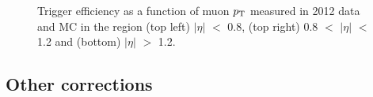 \begin{figure}[h!]

\begin{center}
\end{center}
\caption{Trigger efficiency as a function of muon $p_{\mathrm{T}}$ measured in
2012 data and MC in the region (top left) $|\eta|$ $<$ 0.8, (top right) 0.8
$<$ $|\eta|$ $<$ 1.2 and (bottom) $|\eta|$ $>$ 1.2.}
\label{fig:muontrg}
\end{figure}

\subsection{Other corrections}

